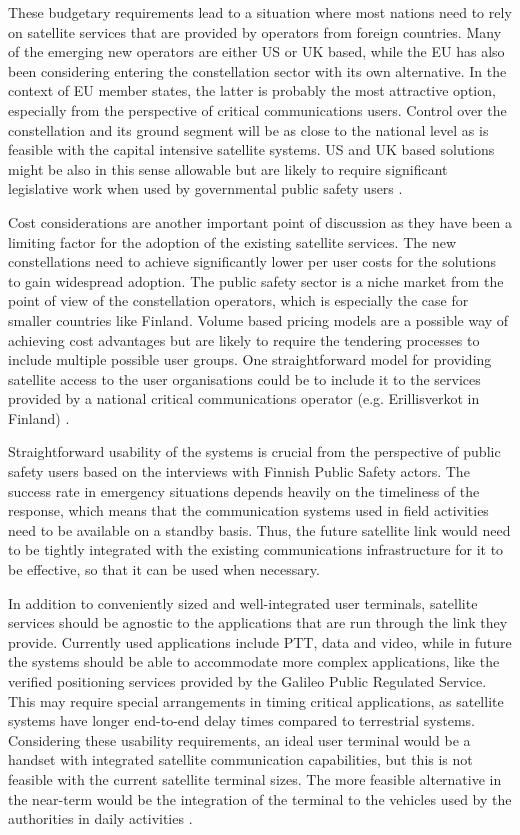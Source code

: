 \documentclass[english, 12pt, a4paper, elec, utf8, a-1b, online]{aaltothesis}
\begin{document}
These budgetary requirements lead to a situation where most nations need to rely on satellite services that are provided by operators from foreign countries.
Many of the emerging new operators are either US or UK based, while the EU has also been considering entering the constellation sector with its own alternative.
In the context of EU member states, the latter is probably the most attractive option, especially from the perspective of critical communications users.
Control over the constellation and its ground segment will be as close to the national level as is feasible with the capital intensive satellite systems.
US and UK based solutions might be also in this sense allowable but are likely to require significant legislative work when used by governmental public safety users \cite{snellman2022european}.

Cost considerations are another important point of discussion as they have been a limiting factor for the adoption of the existing satellite services.
The new constellations need to achieve significantly lower per user costs for the solutions to gain widespread adoption.
The public safety sector is a niche market from the point of view of the constellation operators, which is especially the case for smaller countries like Finland.
Volume based pricing models are a possible way of achieving cost advantages but are likely to require the tendering processes to include multiple possible user groups.
One straightforward model for providing satellite access to the user organisations could be to include it to the services provided by a national critical communications operator (e.g. Erillisverkot in Finland) \cite{saynevirta2021satellite}.

Straightforward usability of the systems is crucial from the perspective of public safety users based on the interviews with Finnish Public Safety actors.
The success rate in emergency situations depends heavily on the timeliness of the response, which means that the communication systems used in field activities need to be available on a standby basis.
Thus, the future satellite link would need to be tightly integrated with the existing communications infrastructure for it to be effective, so that it can be used when necessary.

In addition to conveniently sized and well-integrated user terminals, satellite services should be agnostic to the applications that are run through the link they provide. Currently used applications include PTT, data and video, while in future the systems should be able to accommodate more complex applications, like the verified positioning services provided by the Galileo Public Regulated Service. This may require special arrangements in timing critical applications, as satellite systems have longer end-to-end delay times compared to terrestrial systems.
Considering these usability requirements, an ideal user terminal would be a handset with integrated satellite communication capabilities, but this is not feasible with the current satellite terminal sizes. The more feasible alternative in the near-term would be the integration of the terminal to the vehicles used by the authorities in daily activities \cite{saynevirta2021satellite}.
\end{document}
